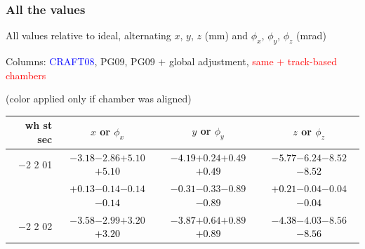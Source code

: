 \documentclass[compress]{beamer}
\begin{document}
\begin{frame}
\frametitle{All the values}
\tiny

All values relative to ideal, alternating $x$, $y$, $z$ (mm) and $\phi_x$, $\phi_y$, $\phi_z$ (mrad)

Columns: \textcolor{blue}{CRAFT08}, PG09, PG09 $+$ global adjustment, \textcolor{red}{same $+$ track-based chambers}

\hfill (color applied only if chamber was aligned)

\vfill
\renewcommand{\arraystretch}{1.1}
\begin{tabular}{r | c | c | c}
wh st sec & $x$ or $\phi_x$ & $y$ or $\phi_y$ & $z$ or $\phi_z$ \\\hline
$-$2 2 01 & \textcolor{black}{$-3.18$}\hspace{0.1 cm}$-2.86$\hspace{0.1 cm}$+5.10$\hspace{0.1 cm}\textcolor{black}{$+5.10$} & \textcolor{black}{$-4.19$}\hspace{0.1 cm}$+0.24$\hspace{0.1 cm}$+0.49$\hspace{0.1 cm}\textcolor{black}{$+0.49$} & \textcolor{black}{$-5.77$}\hspace{0.1 cm}$-6.24$\hspace{0.1 cm}$-8.52$\hspace{0.1 cm}\textcolor{black}{$-8.52$} \\
          & \textcolor{black}{$+0.13$}\hspace{0.1 cm}$-0.14$\hspace{0.1 cm}$-0.14$\hspace{0.1 cm}\textcolor{black}{$-0.14$} & \textcolor{black}{$-0.31$}\hspace{0.1 cm}$-0.33$\hspace{0.1 cm}$-0.89$\hspace{0.1 cm}\textcolor{black}{$-0.89$} & \textcolor{black}{$+0.21$}\hspace{0.1 cm}$-0.04$\hspace{0.1 cm}$-0.04$\hspace{0.1 cm}\textcolor{black}{$-0.04$} \\
$-$2 2 02 & \textcolor{black}{$-3.58$}\hspace{0.1 cm}$-2.99$\hspace{0.1 cm}$+3.20$\hspace{0.1 cm}\textcolor{black}{$+3.20$} & \textcolor{black}{$-3.87$}\hspace{0.1 cm}$+0.64$\hspace{0.1 cm}$+0.89$\hspace{0.1 cm}\textcolor{black}{$+0.89$} & \textcolor{black}{$-4.38$}\hspace{0.1 cm}$-4.03$\hspace{0.1 cm}$-8.56$\hspace{0.1 cm}\textcolor{black}{$-8.56$} \\

\end{tabular}
\end{frame}
\end{document}
